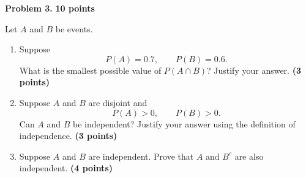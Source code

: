 \documentclass[11pt]{article}
\begin{document}
\newpage


\begin{problemheader}
\textbf{Problem 3.} \hfill \textbf{10 points}
\end{problemheader}

Let $A$ and $B$ be events.

\begin{enumerate}[label=(\alph*),leftmargin=*,itemsep=1em]

    \item Suppose
    \[
    P(A)=0.7,
    \qquad
    P(B)=0.6.
    \]
    What is the smallest possible value of $P(A\cap B)$?
    Justify your answer.
    \hfill \textbf{(3 points)}

    \item Suppose $A$ and $B$ are disjoint and
    \[
    P(A)>0,
    \qquad
    P(B)>0.
    \]
    Can $A$ and $B$ be independent? Justify your answer using the
    definition of independence.
    \hfill \textbf{(3 points)}

    \item Suppose $A$ and $B$ are independent. Prove that
    $A$ and $B^c$ are also independent.
    \hfill \textbf{(4 points)}

\end{enumerate}
\end{document}
